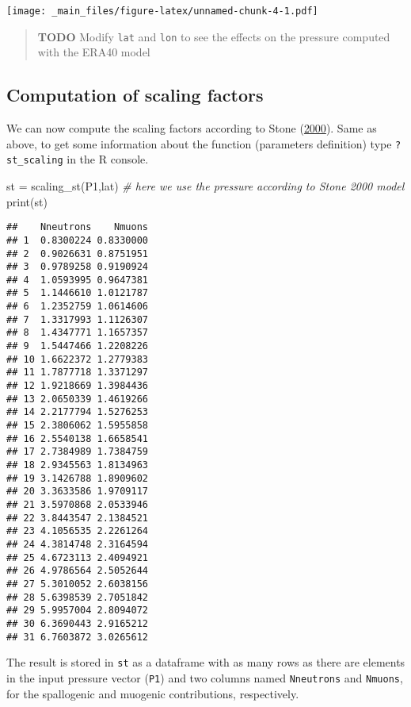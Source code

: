 \documentclass[
]{book}
\newenvironment{Shaded}{\begin{snugshade}}{\end{snugshade}}
\newcommand{\CommentTok}[1]{\textcolor[rgb]{0.56,0.35,0.01}{\textit{#1}}}
\newcommand{\FunctionTok}[1]{\textcolor[rgb]{0.00,0.00,0.00}{#1}}
\newcommand{\NormalTok}[1]{#1}
\newcommand{\OtherTok}[1]{\textcolor[rgb]{0.56,0.35,0.01}{#1}}
\begin{document}
\texttt{[image: \_main\_files/figure-latex/unnamed-chunk-4-1.pdf]}

\begin{quote}
\textbf{TODO} Modify \texttt{lat} and \texttt{lon} to see the effects on the pressure computed with the ERA40 model
\end{quote}

\hypertarget{computation-of-scaling-factors}{%
\subsection{Computation of scaling factors}\label{computation-of-scaling-factors}}

We can now compute the scaling factors according to Stone (\protect\hyperlink{ref-stone2000air}{2000}).
Same as above, to get some information about the function (parameters definition) type \texttt{?st\_scaling} in the R console.

\begin{Shaded}
\begin{Highlighting}[]
\NormalTok{st }\OtherTok{=} \FunctionTok{scaling\_st}\NormalTok{(P1,lat) }\CommentTok{\# here we use the pressure according to Stone 2000 model}
\FunctionTok{print}\NormalTok{(st)}
\end{Highlighting}
\end{Shaded}

\begin{verbatim}
##    Nneutrons    Nmuons
## 1  0.8300224 0.8330000
## 2  0.9026631 0.8751951
## 3  0.9789258 0.9190924
## 4  1.0593995 0.9647381
## 5  1.1446610 1.0121787
## 6  1.2352759 1.0614606
## 7  1.3317993 1.1126307
## 8  1.4347771 1.1657357
## 9  1.5447466 1.2208226
## 10 1.6622372 1.2779383
## 11 1.7877718 1.3371297
## 12 1.9218669 1.3984436
## 13 2.0650339 1.4619266
## 14 2.2177794 1.5276253
## 15 2.3806062 1.5955858
## 16 2.5540138 1.6658541
## 17 2.7384989 1.7384759
## 18 2.9345563 1.8134963
## 19 3.1426788 1.8909602
## 20 3.3633586 1.9709117
## 21 3.5970868 2.0533946
## 22 3.8443547 2.1384521
## 23 4.1056535 2.2261264
## 24 4.3814748 2.3164594
## 25 4.6723113 2.4094921
## 26 4.9786564 2.5052644
## 27 5.3010052 2.6038156
## 28 5.6398539 2.7051842
## 29 5.9957004 2.8094072
## 30 6.3690443 2.9165212
## 31 6.7603872 3.0265612
\end{verbatim}

The result is stored in \texttt{st} as a dataframe with as many rows as there are elements in the input pressure vector (\texttt{P1}) and two columns named \texttt{Nneutrons} and \texttt{Nmuons}, for the spallogenic and muogenic contributions, respectively.
\end{document}
